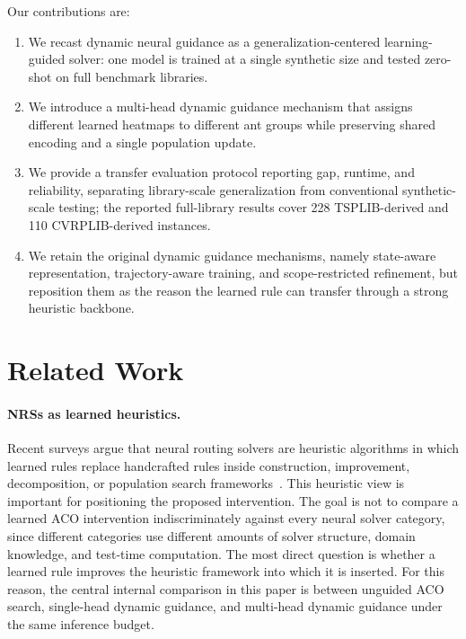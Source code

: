 \documentclass[11pt]{article}
\begin{document}
Our contributions are:
\begin{enumerate}
    \item We recast dynamic neural guidance as a generalization-centered learning-guided solver: one model is trained at a single synthetic size and tested zero-shot on full benchmark libraries.
    \item We introduce a multi-head dynamic guidance mechanism that assigns different learned heatmaps to different ant groups while preserving shared encoding and a single population update.
    \item We provide a transfer evaluation protocol reporting gap, runtime, and reliability, separating library-scale generalization from conventional synthetic-scale testing; the reported full-library results cover 228 TSPLIB-derived and 110 CVRPLIB-derived instances.
    \item We retain the original dynamic guidance mechanisms, namely state-aware representation, trajectory-aware training, and scope-restricted refinement, but reposition them as the reason the learned rule can transfer through a strong heuristic backbone.
\end{enumerate}

\section{Related Work}
\label{sec:related}

\paragraph{NRSs as learned heuristics.}
Recent surveys argue that neural routing solvers are heuristic algorithms in which learned rules replace handcrafted rules inside construction, improvement, decomposition, or population search frameworks~\cite{nrs-survey}.
This heuristic view is important for positioning the proposed intervention.
The goal is not to compare a learned ACO intervention indiscriminately against every neural solver category, since different categories use different amounts of solver structure, domain knowledge, and test-time computation.
The most direct question is whether a learned rule improves the heuristic framework into which it is inserted.
For this reason, the central internal comparison in this paper is between unguided ACO search, single-head dynamic guidance, and multi-head dynamic guidance under the same inference budget.
\end{document}
